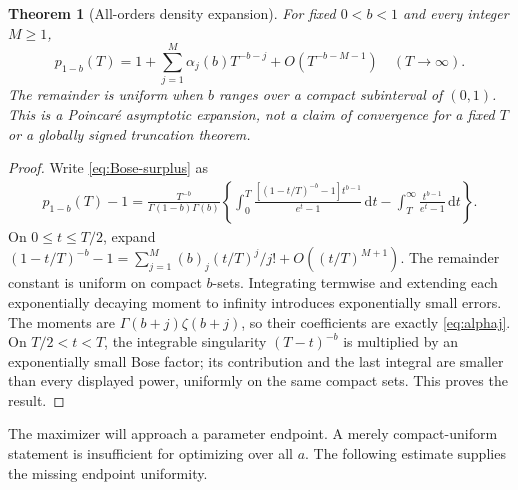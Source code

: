 \documentclass[11pt]{article}
\numberwithin{equation}{section}
\newtheorem{theorem}{Theorem}[section]
\theoremstyle{definition}\newtheorem{definition}[theorem]{Definition}
\theoremstyle{remark}\newtheorem{remark}[theorem]{Remark}
\newcommand{\dd}{\,\mathrm d}
\begin{document}
\begin{theorem}[All-orders density expansion]\label{thm:densityall}
For fixed $0<b<1$ and every integer $M\ge1$,
\begin{equation}\label{eq:densityall}
 p_{1-b}(T)=1+\sum_{j=1}^M\alpha_j(b)T^{-b-j}
             +O(T^{-b-M-1})\quad(T\to\infty).
\end{equation}
The remainder is uniform when $b$ ranges over a compact subinterval of
$(0,1)$. This is a Poincar\'e asymptotic expansion, not a claim of
convergence for a fixed $T$ or a globally signed truncation theorem.
\end{theorem}
\begin{proof}
Write \eqref{eq:Bose-surplus} as
\begin{align}\label{eq:scaledBose}
 p_{1-b}(T)-1=\frac{T^{-b}}{\Gamma(1-b)\Gamma(b)}
 \left\{\int_0^T\frac{[(1-t/T)^{-b}-1]t^{b-1}}{e^t-1}\dd t
 -\int_T^\infty\frac{t^{b-1}}{e^t-1}\dd t\right\}.
\end{align}
On $0\le t\le T/2$, expand
$(1-t/T)^{-b}-1=\sum_{j=1}^M(b)_j(t/T)^j/j!
+O((t/T)^{M+1})$. The remainder constant is uniform on compact
$b$-sets. Integrating termwise and extending each exponentially decaying
moment to infinity introduces exponentially small errors. The moments
are $\Gamma(b+j)\zeta(b+j)$, so their coefficients are exactly
\eqref{eq:alphaj}. On $T/2<t<T$, the integrable singularity
$(T-t)^{-b}$ is multiplied by an exponentially small Bose factor;
its contribution and the last integral are smaller than every displayed
power, uniformly on the same compact sets. This proves the result.
\end{proof}

The maximizer will approach a parameter endpoint. A merely compact-uniform
statement is insufficient for optimizing over all $a$. The following
estimate supplies the missing endpoint uniformity.
\end{document}
